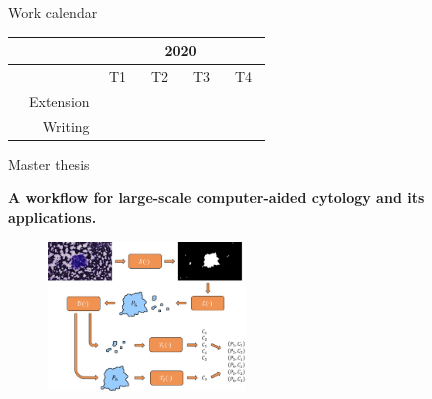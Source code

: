 \documentclass{beamer}
\begin{document}
\begin{frame}{Work calendar}
\begin{table}
\vfill

	\begin{tabular}{|c|r|cccccccccccc|}
		\hline
		& & \multicolumn{12}{c|}{2020}  \\
		\hline	
		& & \multicolumn{3}{c|}{T1} & \multicolumn{3}{c|}{T2} & \multicolumn{3}{c|}{T3} & \multicolumn{3}{c|}{T4} \\ 
		\hline
		& Extension & \cellcolor{black} & \cellcolor{black} & & & & & & & & &  & \\
		& Writing & & & \cellcolor{black} & \cellcolor{black} & \cellcolor{black} & \cellcolor{black} & \cellcolor{black} & \cellcolor{black} & & & & \\
		\hline 
	\end{tabular}


	\end{table}
\end{frame}


\begin{frame}{Master thesis}	
	\begin{center}
		\textbf{A workflow for large-scale computer-aided cytology and its applications.}
	\end{center}		
	\begin{figure}
		\center
		\includegraphics[height=150px]{images/workflow_illustration.png}
	\end{figure}	
\end{frame}
\end{document}
